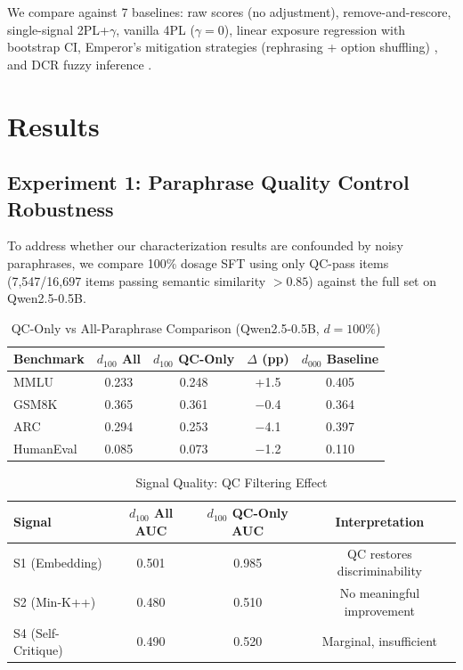 \documentclass[11pt]{article}
\begin{document}
We compare against 7 baselines: raw scores (no adjustment), remove-and-rescore, single-signal 2PL+$\gamma$, vanilla 4PL ($\gamma=0$), linear exposure regression with bootstrap CI, Emperor's mitigation strategies (rephrasing + option shuffling) \citep{xu2025emperor}, and DCR fuzzy inference \citep{oren2024proving}.

\section{Results}

\subsection{Experiment 1: Paraphrase Quality Control Robustness}
\label{sec:qc}

To address whether our characterization results are confounded by noisy paraphrases, we compare 100\% dosage SFT using only QC-pass items (7,547/16,697 items passing semantic similarity $> 0.85$) against the full set on Qwen2.5-0.5B.

\begin{table}[h]
\centering
\caption{QC-Only vs All-Paraphrase Comparison (Qwen2.5-0.5B, $d=100\%$)}
\label{tab:qc}
\begin{tabular}{lcccc}
\toprule
Benchmark & $d_{100}$ All & $d_{100}$ QC-Only & $\Delta$ (pp) & $d_{000}$ Baseline \\
\midrule
MMLU & 0.233 & 0.248 & +1.5 & 0.405 \\
GSM8K & 0.365 & 0.361 & $-$0.4 & 0.364 \\
ARC & 0.294 & 0.253 & $-$4.1 & 0.397 \\
HumanEval & 0.085 & 0.073 & $-$1.2 & 0.110 \\
\bottomrule
\end{tabular}
\end{table}

\begin{table}[h]
\centering
\caption{Signal Quality: QC Filtering Effect}
\label{tab:qc_signal}
\begin{tabular}{lccc}
\toprule
Signal & $d_{100}$ All AUC & $d_{100}$ QC-Only AUC & Interpretation \\
\midrule
S1 (Embedding) & 0.501 & 0.985 & QC restores discriminability \\
S2 (Min-K++) & 0.480 & 0.510 & No meaningful improvement \\
S4 (Self-Critique) & 0.490 & 0.520 & Marginal, insufficient \\
\bottomrule
\end{tabular}
\end{table}
\end{document}
